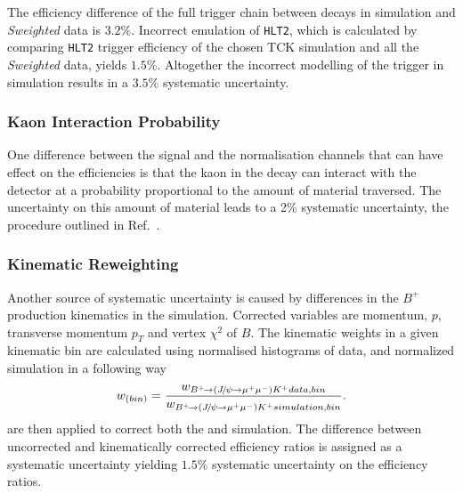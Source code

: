 The efficiency difference of the full trigger chain between \bjpsik decays in \DIFdelbegin {}\DIFdelend simulation and \textit{Sweighted} data is $3.2\%$. Incorrect emulation of \texttt{HLT2}, which is calculated by comparing \texttt{HLT2} trigger efficiency of the chosen TCK simulation and all the \textit{Sweighted} data, yields $1.5\%$. Altogether the incorrect modelling of the trigger in simulation results in a $3.5\%$ systematic uncertainty.

\subsubsection{Kaon Interaction Probability}
One difference between the signal and the normalisation channels that can have \DIFaddbegin {}\DIFaddend effect on the efficiencies is that the kaon in the decay \bjpsimumuk can interact with the detector at a probability proportional to the amount of material traversed. The uncertainty on this amount of material leads to a 2\% systematic
uncertainty, \DIFdelbegin {}\DIFdelend \DIFaddbegin {}\DIFaddend the procedure outlined in Ref.~\cite{LHCb-DP-2013-002}.

\subsubsection{Kinematic Reweighting}
Another source of systematic uncertainty is caused by differences in the $B^{+}$ production kinematics in the simulation. Corrected variables are momentum, $p$, transverse momentum $p_{T}$ and vertex $\chi^{2}$ of \DIFaddbegin {}\DIFaddend $B$. The kinematic weights in a given kinematic bin are calculated using normalised histograms of \bjpsimumuk data, and normalized \bjpsimumuk simulation in a following way
\begin{equation}
w_{(bin)} =  \frac{w_{{{{B}^+}}\!\rightarrow ({{J\mskip -3mu/\mskip -2mu\psi\mskip 2mu}}\!\rightarrow {\ensuremath{\mu^+\mu^-}}){{K}^+} data,bin}}{w_{{{{B}^+}}\!\rightarrow ({{J\mskip -3mu/\mskip -2mu\psi\mskip 2mu}}\!\rightarrow {\ensuremath{\mu^+\mu^-}}){{K}^+} simulation,bin}}.
\end{equation}
\DIFdelbegin {}\DIFdelend \DIFaddbegin {}\DIFaddend are then applied to correct both the \bjpsimumuk and \Bmumumu simulation. The difference between uncorrected and kinematically corrected efficiency ratios is assigned as a systematic uncertainty yielding $1.5\%$ systematic uncertainty on the efficiency ratios.


